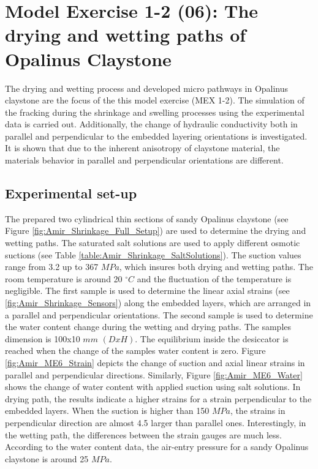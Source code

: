 \section{Model Exercise 1-2 (06): The drying and wetting paths of Opalinus Claystone}
\label{sec:mex06}

The drying and wetting process and developed micro pathways in Opalinus claystone are the focus of the this model exercise (MEX 1-2). The simulation of the fracking during the shrinkage and swelling processes using the experimental data is carried out. Additionally, the change of hydraulic conductivity both in parallel and perpendicular to the embedded layering orientations is investigated. It is shown that due to the inherent anisotropy of claystone material, the materials behavior in parallel and perpendicular orientations are different.  

\subsection{Experimental set-up}
The prepared two cylindrical thin sections of sandy Opalinus claystone (see Figure \ref{fig:Amir_Shrinkage_Full_Setup}) are used to determine the drying and wetting paths. The saturated salt solutions are used to apply different osmotic suctions (see Table \ref{table:Amir_Shrinkage_SaltSolutions}). The suction values range from 3.2 up to 367 $MPa$, which insures both drying and wetting paths. The room temperature is around 20 $^{\circ}C$ and the fluctuation of the temperature is negligible. The first sample is used to determine the linear axial strains (see \ref{fig:Amir_Shrinkage_Sensors}) along the embedded layers, which are arranged in a parallel and perpendicular orientations. The second sample is used to determine the water content change during the wetting and drying paths. The samples dimension is 100x10 $mm$ $(DxH)$. The equilibrium inside the desiccator is reached when the change of the samples water content is zero. Figure \ref{fig:Amir_ME6_Strain} depicts the change of suction and axial linear strains in parallel and perpendicular directions. Similarly, Figure \ref{fig:Amir_ME6_Water} shows the change of water content with applied suction using salt solutions. In drying path, the results indicate a higher strains for a strain perpendicular to the embedded layers. When the suction is higher than 150 $MPa$, the strains in perpendicular direction are almost 4.5 larger than parallel ones. Interestingly, in the wetting path, the differences between the strain gauges are much less.  According to the water content data, the air-entry pressure for a sandy Opalinus claystone is around 25 $MPa$.

